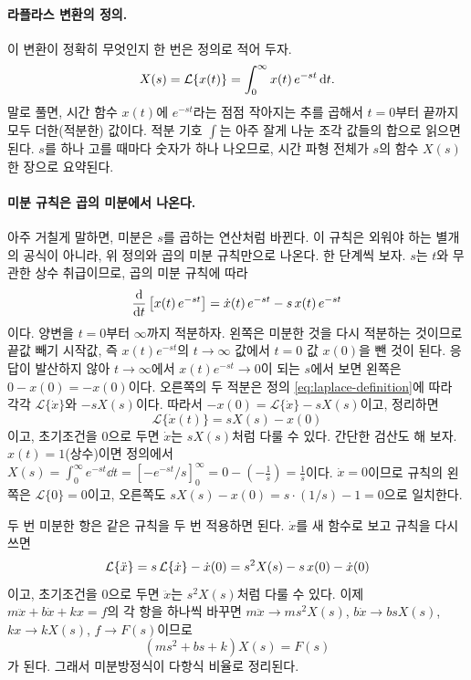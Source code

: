 \paragraph{라플라스 변환의 정의.}
이 변환이 정확히 무엇인지 한 번은 정의로 적어 두자.
\begin{equation}
  X(s)
  =
  \mathcal{L}\{x(t)\}
  =
  \int_{0}^{\infty} x(t)\,e^{-st}\,\dd t.
  \label{eq:laplace-definition}
\vmark{laplace-definition-integral}%
\end{equation}
말로 풀면, 시간 함수 $x(t)$에 $e^{-st}$라는 점점 작아지는 추를 곱해서 $t=0$부터 끝까지 모두 더한(적분한) 값이다.
적분 기호 $\int$는 아주 잘게 나눈 조각 값들의 합으로 읽으면 된다.
$s$를 하나 고를 때마다 숫자가 하나 나오므로, 시간 파형 전체가 $s$의 함수 $X(s)$ 한 장으로 요약된다.

\paragraph{미분 규칙은 곱의 미분에서 나온다.}
아주 거칠게 말하면, 미분은 $s$를 곱하는 연산처럼 바뀐다.
이 규칙은 외워야 하는 별개의 공식이 아니라, 위 정의와 곱의 미분 규칙만으로 나온다.
한 단계씩 보자.
$s$는 $t$와 무관한 상수 취급이므로, 곱의 미분 규칙에 따라
\[
  \frac{\dd}{\dd t}\left[x(t)\,e^{-st}\right]
  =
  \dot{x}(t)\,e^{-st}
  -
  s\,x(t)\,e^{-st}
\vmark{laplace-rule-product-rule-derivation}%
\]
이다.
양변을 $t=0$부터 $\infty$까지 적분하자.
왼쪽은 미분한 것을 다시 적분하는 것이므로 끝값 빼기 시작값, 즉 $x(t)e^{-st}$의 $t\to\infty$ 값에서 $t=0$ 값 $x(0)$을 뺀 것이 된다.
응답이 발산하지 않아 $t\to\infty$에서 $x(t)e^{-st}\to0$이 되는 $s$에서 보면 왼쪽은 $0-x(0)=-x(0)$이다.
오른쪽의 두 적분은 정의 \eqref{eq:laplace-definition}에 따라 각각 $\mathcal{L}\{\dot{x}\}$와 $-sX(s)$이다.
따라서 $-x(0)=\mathcal{L}\{\dot{x}\}-sX(s)$이고, 정리하면
\begin{equation}
  \mathcal{L}\{\dot{x}(t)\}=sX(s)-x(0)
\end{equation}
이고, 초기조건을 0으로 두면 $\dot{x}$는 $sX(s)$처럼 다룰 수 있다.
간단한 검산도 해 보자.
$x(t)=1$(상수)이면 정의에서 $X(s)=\int_0^\infty e^{-st}\dd t=\left[-e^{-st}/s\right]_0^\infty=0-\left(-\tfrac{1}{s}\right)=\tfrac{1}{s}$이다.
$\dot{x}=0$이므로 규칙의 왼쪽은 $\mathcal{L}\{0\}=0$이고, 오른쪽도 $sX(s)-x(0)=s\cdot(1/s)-1=0$으로 일치한다.
%

두 번 미분한 항은 같은 규칙을 두 번 적용하면 된다.
$\dot{x}$를 새 함수로 보고 규칙을 다시 쓰면
\[
  \mathcal{L}\{\ddot{x}\}
  =
  s\,\mathcal{L}\{\dot{x}\}-\dot{x}(0)
  =
  s^2X(s)-s\,x(0)-\dot{x}(0)
\vmark{laplace-second-derivative-twice}%
\]
이고, 초기조건을 0으로 두면 $\ddot{x}$는 $s^2X(s)$처럼 다룰 수 있다.
이제 $m\ddot{x}+b\dot{x}+kx=f$의 각 항을 하나씩 바꾸면 $m\ddot{x}\to ms^2X(s)$, $b\dot{x}\to bsX(s)$, $kx\to kX(s)$, $f\to F(s)$이므로
%
\begin{equation}
  (ms^2+bs+k)X(s)=F(s)
\end{equation}
가 된다.
그래서 미분방정식이 다항식 비율로 정리된다.

